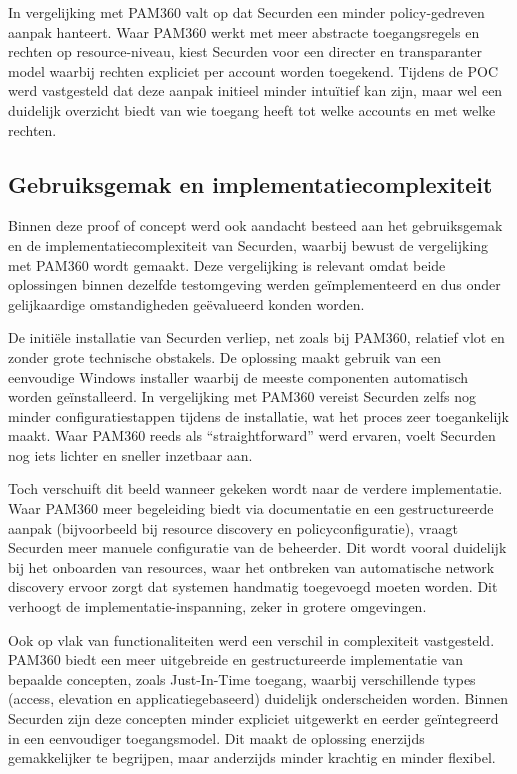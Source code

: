 In vergelijking met PAM360 valt op dat Securden een minder policy-gedreven aanpak hanteert. Waar PAM360 werkt met meer abstracte toegangsregels en rechten op resource-niveau, kiest Securden voor een directer en transparanter model waarbij rechten expliciet per account worden toegekend. Tijdens de POC werd vastgesteld dat deze aanpak initieel minder intuïtief kan zijn, maar wel een duidelijk overzicht biedt van wie toegang heeft tot welke accounts en met welke rechten.

\subsection{Gebruiksgemak en implementatiecomplexiteit}
Binnen deze proof of concept werd ook aandacht besteed aan het gebruiksgemak en de implementatiecomplexiteit van Securden, waarbij bewust de vergelijking met PAM360 wordt gemaakt. Deze vergelijking is relevant omdat beide oplossingen binnen dezelfde testomgeving werden geïmplementeerd en dus onder gelijkaardige omstandigheden geëvalueerd konden worden.

De initiële installatie van Securden verliep, net zoals bij PAM360, relatief vlot en zonder grote technische obstakels. De oplossing maakt gebruik van een eenvoudige Windows installer waarbij de meeste componenten automatisch worden geïnstalleerd. In vergelijking met PAM360 vereist Securden zelfs nog minder configuratiestappen tijdens de installatie, wat het proces zeer toegankelijk maakt. Waar PAM360 reeds als “straightforward” werd ervaren, voelt Securden nog iets lichter en sneller inzetbaar aan.

Toch verschuift dit beeld wanneer gekeken wordt naar de verdere implementatie. Waar PAM360 meer begeleiding biedt via documentatie en een gestructureerde aanpak (bijvoorbeeld bij resource discovery en policyconfiguratie), vraagt Securden meer manuele configuratie van de beheerder. Dit wordt vooral duidelijk bij het onboarden van resources, waar het ontbreken van automatische network discovery ervoor zorgt dat systemen handmatig toegevoegd moeten worden. Dit verhoogt de implementatie-inspanning, zeker in grotere omgevingen.

Ook op vlak van functionaliteiten werd een verschil in complexiteit vastgesteld. PAM360 biedt een meer uitgebreide en gestructureerde implementatie van bepaalde concepten, zoals Just-In-Time toegang, waarbij verschillende types (access, elevation en applicatiegebaseerd) duidelijk onderscheiden worden. Binnen Securden zijn deze concepten minder expliciet uitgewerkt en eerder geïntegreerd in een eenvoudiger toegangsmodel. Dit maakt de oplossing enerzijds gemakkelijker te begrijpen, maar anderzijds minder krachtig en minder flexibel.

